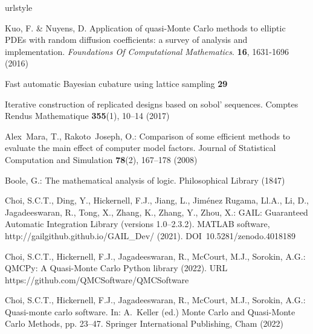 \documentclass[graybox]{svmult}
\begin{document}
%
%
%

\begin{thebibliography}{10}
\providecommand{\url}[1]{{#1}}
\providecommand{\urlprefix}{URL }
\expandafter\ifx\csname urlstyle\endcsname\relax
  \providecommand{\doi}[1]{DOI~\discretionary{}{}{}#1}\else
  \providecommand{\doi}{DOI~\discretionary{}{}{}\begingroup
  \urlstyle{rm}\Url}\fi

Kuo, F. \& Nuyens, D. Application of quasi-Monte Carlo methods to elliptic PDEs with random diffusion coefficients: a survey of analysis and implementation. {\em Foundations Of Computational Mathematics}. \textbf{16}, 1631-1696 (2016)

Fast automatic Bayesian cubature using lattice sampling \textbf{29}

Iterative construction of replicated designs based on sobol' sequences.
\newblock Comptes Rendus Mathematique \textbf{355}(1), 10--14 (2017)

Alex~Mara, T., Rakoto~Joseph, O.: Comparison of some efficient methods to
  evaluate the main effect of computer model factors.
\newblock Journal of Statistical Computation and Simulation \textbf{78}(2),
  167--178 (2008)

Boole, G.: The mathematical analysis of logic.
\newblock Philosophical Library (1847)

Choi, S.C.T., Ding, Y., Hickernell, F.J., Jiang, L., {Jim\'enez Rugama},
  {\relax Ll}.A., Li, D., Jagadeeswaran, R., Tong, X., Zhang, K., Zhang, Y.,
  Zhou, X.: {GAIL}: {G}uaranteed {A}utomatic {I}ntegration {L}ibrary (versions
  1.0--2.3.2).
\newblock MATLAB software, \url{http://gailgithub.github.io/GAIL\_Dev/} (2021).
\newblock \doi{10.5281/zenodo.4018189}

Choi, S.C.T., Hickernell, F.J., Jagadeeswaran, R., McCourt, M.J., Sorokin,
  A.G.: {QMCPy}: A {Q}uasi-{M}onte {C}arlo {P}ython library (2022).
\newblock \urlprefix\url{https://github.com/QMCSoftware/QMCSoftware}

Choi, S.C.T., Hickernell, F.J., Jagadeeswaran, R., McCourt, M.J., Sorokin,
  A.G.: Quasi-monte carlo software.
\newblock In: A.~Keller (ed.) Monte Carlo and Quasi-Monte Carlo Methods, pp.
  23--47. Springer International Publishing, Cham (2022)


\end{thebibliography}
\end{document}
